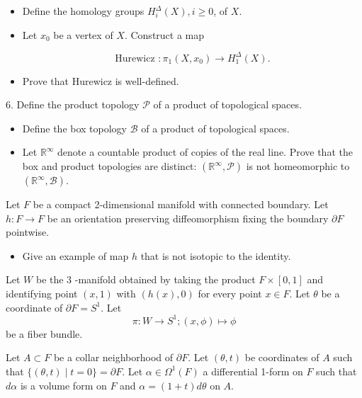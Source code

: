 \documentclass[10pt]{article}
\begin{document}
\begin{itemize}
  \item Define the homology groups $H_{i}^{\Delta}(X), i \geq 0$, of $X$.

  \item {Let $x_{0}$ be a vertex of $X$. Construct a map

  $$
  \text { Hurewicz }: \pi_{1}\left(X, x_{0}\right) \rightarrow H_{1}^{\Delta}(X) \text {. }
  $$}
  \item Prove that Hurewicz is well-defined.
\end{itemize}
\newpage
6. Define the product topology $\mathcal{P}$ of a product of topological spaces.
\begin{itemize}
  \item Define the box topology $\mathcal{B}$ of a product of topological spaces.
  \item Let $\mathbb{R}^{\infty}$ denote a countable product of copies of the real line. Prove that the box and product topologies are distinct: $\left(\mathbb{R}^{\infty}, \mathcal{P}\right)$ is not homeomorphic to $\left(\mathbb{R}^{\infty}, \mathcal{B}\right)$.
\end{itemize}
\newpage
Let $F$ be a compact 2-dimensional manifold with connected boundary. Let $h: F \rightarrow F$ be an orientation preserving diffeomorphism fixing the boundary $\partial F$ pointwise.

\begin{itemize}
  \item Give an example of map $h$ that is not isotopic to the identity.
\end{itemize}

Let $W$ be the 3 -manifold obtained by taking the product $F \times[0,1]$ and identifying point $(x, 1)$ with $(h(x), 0)$ for every point $x \in F$. Let $\theta$ be a coordinate of $\partial F=S^{1}$. Let
$$
\pi: W \rightarrow S^{1} ;(x, \phi) \mapsto \phi
$$
be a fiber bundle.

Let $A \subset F$ be a collar neighborhood of $\partial F$. Let $(\theta, t)$ be coordinates of $A$ such that $\{(\theta, t) \mid t=0\}=\partial F$. Let $\alpha \in \Omega^{1}(F)$ a differential 1-form on $F$ such that $d \alpha$ is a volume form on $F$ and $\alpha=(1+t) d \theta$ on $A$.
\end{document}
